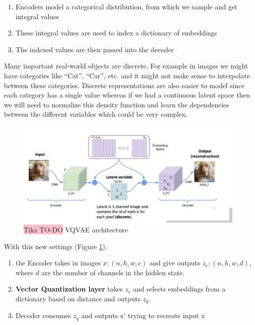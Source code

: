 \begin{enumerate}
    \item Encoders model a categorical distribution, from which we sample and get integral values
    \item  These integral values are used to index a dictionary of embeddings
    \item  The indexed values are then passed into the decoder

\end{enumerate}


Many important real-world objects are discrete. For example in images we might have categories like “Cat”, “Car”, etc. and it might not make sense to interpolate between these categories. Discrete representations are also easier to model since each category has a single value whereas if we had a continuous latent space then we will need to normalize this density function and learn the dependencies between the different variables which could be very complex.

\begin{figure}[!htbp]
    \centering
    \includegraphics[width=1\linewidth]{tikz/VQVAE.png}
    \caption{{\color{red}\colorbox{pink}{Tikz TO-DO}} VQVAE architecture}
    \label{fig:VQVAE}
\end{figure}

With this new settings (Figure \ref{fig:VQVAE}):

\begin{enumerate}
    \item the Encoder takes in images $x: (n, h, w, c)$ and give outputs $z_e: (n, h, w, d)$, where $d$ are the number of channels in the hidden state.
    \item \textbf{Vector Quantization layer} takes $z_e$ and selects embeddings from a dictionary based on distance and outputs $z_q$.
    \item Decoder consumes $z_q$ and outputs x’ trying to recreate input x
\end{enumerate}

